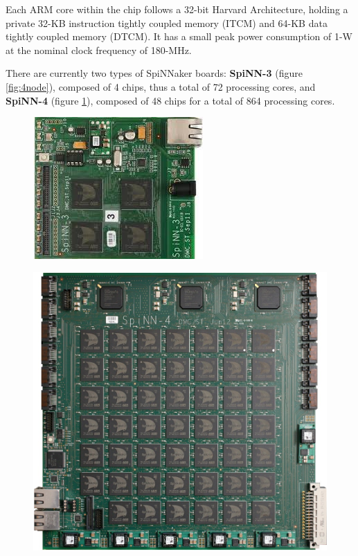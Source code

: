 Each ARM core within the chip follows a 32-bit Harvard Architecture, holding a private 32-KB instruction tightly coupled memory (ITCM) and 64-KB data tightly coupled memory (DTCM).\cite{painkras} It has a small peak power consumption of 1-W at the nominal clock frequency of 180-MHz.\cite{arm968}

There are currently two types of SpiNNaker boards: \textbf{SpiNN-3} (figure \ref{fig:4node}), composed of 4 chips, thus a total of 72 processing cores, and \textbf{SpiNN-4} (figure \ref{fig:48node}), composed of 48 chips for a total of 864 processing cores.

\begin{figure}
\centering
\begin{minipage}{.5\textwidth}
  \centering
  \includegraphics[width=0.4\linewidth, natwidth=245, natheight=205]{images/4node.jpg}
  \label{fig:4node}
\end{minipage}%
\begin{minipage}{.5\textwidth}
  \centering
  \includegraphics[width=0.9\linewidth, natwidth=945, natheight=896]{images/48node.jpg}
  \label{fig:48node}
\end{minipage}
\end{figure}

